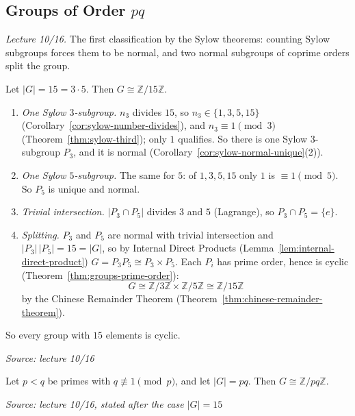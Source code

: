 \documentclass[11pt]{report}
\newcommand{\srcline}[1]{\par\hfill{\footnotesize\textit{Source: #1}}}
\begin{document}
\subsection{\texorpdfstring{Groups of Order $pq$}{Groups of Order pq}}\label{sub:order-pq}

\textit{Lecture 10/16.} The first classification by the Sylow theorems: counting Sylow subgroups forces them to be normal, and two normal subgroups of coprime orders split the group.

\begin{exbox}\label{ex:groups-order-15}
Let $|G| = 15 = 3 \cdot 5$. Then $G \cong \mathbb{Z}/15\mathbb{Z}$.
\begin{enumerate}
    \item \emph{One Sylow $3$-subgroup.} $n_3$ divides $15$, so $n_3 \in \{1, 3, 5, 15\}$ (Corollary~\ref{cor:sylow-number-divides}), and $n_3 \equiv 1 \pmod 3$ (Theorem~\ref{thm:sylow-third}); only $1$ qualifies. So there is one Sylow $3$-subgroup $P_3$, and it is normal (Corollary~\ref{cor:sylow-normal-unique}(2)).
    \item \emph{One Sylow $5$-subgroup.} The same for $5$: of $1, 3, 5, 15$ only $1$ is $\equiv 1 \pmod 5$. So $P_5$ is unique and normal.
    \item \emph{Trivial intersection.} $|P_3 \cap P_5|$ divides $3$ and $5$ (Lagrange), so $P_3 \cap P_5 = \{e\}$.
    \item \emph{Splitting.} $P_3$ and $P_5$ are normal with trivial intersection and $|P_3|\,|P_5| = 15 = |G|$, so by Internal Direct Products (Lemma~\ref{lem:internal-direct-product}) $G = P_3P_5 \cong P_3 \times P_5$. Each $P_i$ has prime order, hence is cyclic (Theorem~\ref{thm:groups-prime-order}):
    \[ G \cong \mathbb{Z}/3\mathbb{Z} \times \mathbb{Z}/5\mathbb{Z} \cong \mathbb{Z}/15\mathbb{Z} \]
    by the Chinese Remainder Theorem (Theorem~\ref{thm:chinese-remainder-theorem}).
\end{enumerate}
So every group with $15$ elements is cyclic.
\srcline{lecture 10/16}
\end{exbox}

\begin{propbox}\label{prop:groups-order-pq}
Let $p < q$ be primes with $q \not\equiv 1 \pmod p$, and let $|G| = pq$. Then $G \cong \mathbb{Z}/pq\mathbb{Z}$.
\srcline{lecture 10/16, stated after the case $|G| = 15$}
\end{propbox}
\end{document}
